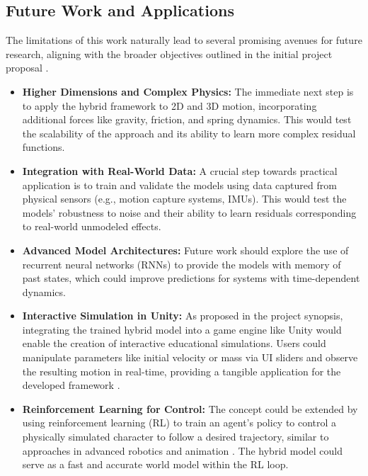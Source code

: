 \documentclass[conference]{IEEEtran}
\begin{document}
\subsection{Future Work and Applications}
The limitations of this work naturally lead to several promising avenues for future research, aligning with the broader objectives outlined in the initial project proposal \cite{b3}.
\begin{itemize}
    \item \textbf{Higher Dimensions and Complex Physics:} The immediate next step is to apply the hybrid framework to 2D and 3D motion, incorporating additional forces like gravity, friction, and spring dynamics. This would test the scalability of the approach and its ability to learn more complex residual functions.
    \item \textbf{Integration with Real-World Data:} A crucial step towards practical application is to train and validate the models using data captured from physical sensors (e.g., motion capture systems, IMUs). This would test the models' robustness to noise and their ability to learn residuals corresponding to real-world unmodeled effects.
    \item \textbf{Advanced Model Architectures:} Future work should explore the use of recurrent neural networks (RNNs) to provide the models with memory of past states, which could improve predictions for systems with time-dependent dynamics.
    \item \textbf{Interactive Simulation in Unity:} As proposed in the project synopsis, integrating the trained hybrid model into a game engine like Unity would enable the creation of interactive educational simulations. Users could manipulate parameters like initial velocity or mass via UI sliders and observe the resulting motion in real-time, providing a tangible application for the developed framework \cite{b2}.
    \item \textbf{Reinforcement Learning for Control:} The concept could be extended by using reinforcement learning (RL) to train an agent's policy to control a physically simulated character to follow a desired trajectory, similar to approaches in advanced robotics and animation \cite{b6}. The hybrid model could serve as a fast and accurate world model within the RL loop.
\end{itemize}
\end{document}
